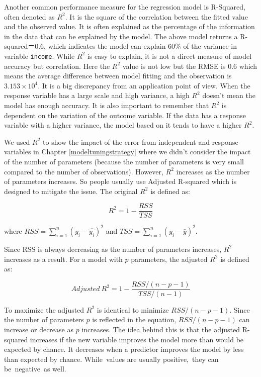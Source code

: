\documentclass[
  12pt,
]{krantz}
\begin{document}
Another common performance measure for the regression model is R-Squared, often denoted as \(R^2\). It is the square of the correlation between the fitted value and the observed value. It is often explained as the percentage of the information in the data that can be explained by the model. The above model returns a R-squared＝0.6, which indicates the model can explain 60\% of the variance in variable \texttt{income}. While \(R^2\) is easy to explain, it is not a direct measure of model accuracy but correlation. Here the \(R^2\) value is not low but the RMSE is 0.6 which means the average difference between model fitting and the observation is \ensuremath{3.153\times 10^{4}}. It is a big discrepancy from an application point of view. When the response variable has a large scale and high variance, a high \(R^2\) doesn't mean the model has enough accuracy. It is also important to remember that \(R^2\) is dependent on the variation of the outcome variable. If the data has a response variable with a higher variance, the model based on it tends to have a higher \(R^2\).

We used \(R^2\) to show the impact of the error from independent and response variables in Chapter \ref{modeltuningstrategy} where we didn't consider the impact of the number of parameters (because the number of parameters is very small compared to the number of observations). However, \(R^2\) increases as the number of parameters increases. So people usually use Adjusted R-squared which is designed to mitigate the issue. The original \(R^2\) is defined as:

\[R^{2}=1-\frac{RSS}{TSS}\]

where \(RSS=\sum_{i=1}^{n}(y_{i}-\hat{y_{i}})^{2}\) and \(TSS=\sum_{i=1}^{n}(y_{i}-\bar{y})^{2}\).

Since RSS is always decreasing as the number of parameters increases, \(R^2\) increases as a result. For a model with \(p\) parameters, the adjusted \(R^2\) is defined as:

\[Adjusted\ R^{2}=1-\frac{RSS/(n-p-1)}{TSS/(n-1)}\]

To maximize the adjusted \(R^{2}\) is identical to minimize \(RSS/(n-p-1)\). Since the number of parameters \(p\) is reflected in the equation, \(RSS/(n-p-1)\) can increase or decrease as \(p\) increases. The idea behind this is that the adjusted R-squared increases if the new variable improves the model more than would be expected by chance. It decreases when a predictor improves the model by less than expected by chance. While~values are usually positive,~they can be~negative~as well.
\end{document}
